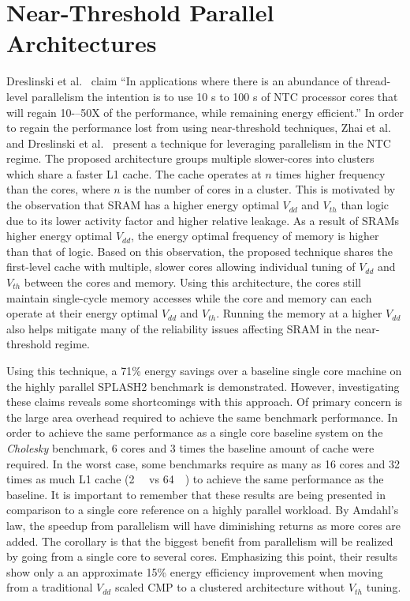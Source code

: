 \section{Near-Threshold Parallel Architectures} \label{sec:clustering}

Dreslinski et al.~\cite{dreslinski2010near} claim ``In applications where there
is an abundance of thread-level parallelism the intention is to use 10 s to 100
s of NTC processor cores that will regain 10-–50X of the performance, while
remaining energy efficient.'' In order to regain the performance lost from using
near-threshold techniques, Zhai et al.~\cite{Zhai:2007kn} and Dreslinski et
al.~\cite{Dreslinski:2007id} present a technique for leveraging parallelism in
the NTC regime. The proposed architecture groups multiple slower-cores into
clusters which share a faster L1 cache. The cache operates at $n$ times higher
frequency than the cores, where $n$ is the number of cores in a cluster. This is
motivated by the observation that SRAM has a higher energy optimal $V_{dd}$ and
$V_{th}$ than logic due to its lower activity factor and higher relative
leakage.  As a result of SRAMs higher energy optimal $V_{dd}$, the energy
optimal frequency of memory is higher than that of logic.  Based on this
observation, the proposed technique shares the first-level cache with multiple,
slower cores allowing individual tuning of $V_{dd}$ and $V_{th}$ between the
cores and memory. Using this architecture, the cores still maintain single-cycle
memory accesses while the core and memory can each operate at their energy
optimal $V_{dd}$ and $V_{th}$. Running the memory at a higher $V_{dd}$ also
helps mitigate many of the reliability issues affecting SRAM in the
near-threshold regime.

Using this technique, a 71\% energy savings over a baseline single core machine
on the highly parallel SPLASH2 benchmark is demonstrated. However, investigating
these claims reveals some shortcomings with this approach.  Of primary concern
is the large area overhead required to achieve the same benchmark performance.
In order to achieve the same performance as a single core baseline system on the
\emph{Cholesky} benchmark, 6 cores and 3 times the baseline amount of cache were
required.  In the worst case, some benchmarks require as many as 16 cores and 32
times as much L1 cache (\SI{2}{\mega\byte} vs \SI{64}{\kilo\byte}) to achieve
the same performance as the baseline.  It is important to remember that these
results are being presented in comparison to a single core reference on a highly
parallel workload. By Amdahl's law, the speedup from parallelism will have
diminishing returns as more cores are added.  The corollary is that the biggest
benefit from parallelism will be realized by going from a single core to several
cores. Emphasizing this point, their results show only a an approximate 15\%
energy efficiency improvement when moving from a traditional $V_{dd}$ scaled CMP
to a clustered architecture without $V_{th}$ tuning.


